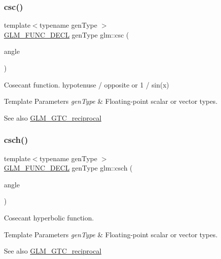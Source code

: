 \subsubsection{\texorpdfstring{csc()}{csc()}}
{\footnotesize\ttfamily template$<$typename gen\+Type $>$ \\
\hyperlink{setup_8hpp_ab2d052de21a70539923e9bcbf6e83a51}{G\+L\+M\+\_\+\+F\+U\+N\+C\+\_\+\+D\+E\+CL} gen\+Type glm\+::csc (\begin{DoxyParamCaption}\item[{gen\+Type}]{angle }\end{DoxyParamCaption})}

Cosecant function. hypotenuse / opposite or 1 / sin(x)


\begin{DoxyTemplParams}{Template Parameters}
{\em gen\+Type} & Floating-\/point scalar or vector types.\\
\hline
\end{DoxyTemplParams}
\begin{DoxySeeAlso}{See also}
\hyperlink{group__gtc__reciprocal}{G\+L\+M\+\_\+\+G\+T\+C\+\_\+reciprocal} 
\end{DoxySeeAlso}
\mbox{\label{group__gtc__reciprocal_ga6d95843ff3ca6472ab399ba171d290a0}} 
\subsubsection{\texorpdfstring{csch()}{csch()}}
{\footnotesize\ttfamily template$<$typename gen\+Type $>$ \\
\hyperlink{setup_8hpp_ab2d052de21a70539923e9bcbf6e83a51}{G\+L\+M\+\_\+\+F\+U\+N\+C\+\_\+\+D\+E\+CL} gen\+Type glm\+::csch (\begin{DoxyParamCaption}\item[{gen\+Type}]{angle }\end{DoxyParamCaption})}

Cosecant hyperbolic function.


\begin{DoxyTemplParams}{Template Parameters}
{\em gen\+Type} & Floating-\/point scalar or vector types.\\
\hline
\end{DoxyTemplParams}
\begin{DoxySeeAlso}{See also}
\hyperlink{group__gtc__reciprocal}{G\+L\+M\+\_\+\+G\+T\+C\+\_\+reciprocal} 
\end{DoxySeeAlso}
\mbox{\label{group__gtc__reciprocal_gae4bcbebee670c5ea155f0777b3acbd84}} 
